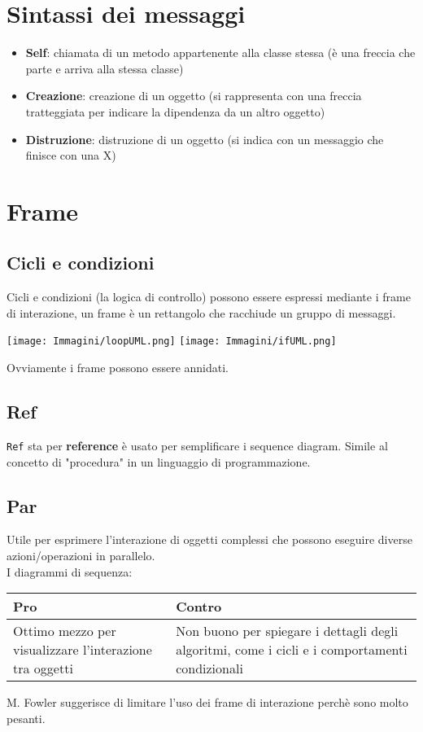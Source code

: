 \documentclass[12pt, a4paper]{report}
\begin{document}
\section{Sintassi dei messaggi}
\begin{itemize}
    \item \textbf{Self}: chiamata di un metodo appartenente alla classe stessa (è una freccia che parte e arriva alla stessa classe)
    \item \textbf{Creazione}: creazione di un oggetto (si rappresenta con una freccia tratteggiata per indicare la dipendenza da un altro oggetto)
    \item \textbf{Distruzione}: distruzione di un oggetto (si indica con un messaggio che finisce con una X)
\end{itemize}
\section{Frame}
\subsection{Cicli e condizioni}
Cicli e condizioni (la logica di controllo) possono essere espressi mediante i frame di interazione, un frame è un rettangolo che racchiude un gruppo di messaggi.
\begin{center}
    \texttt{[image: Immagini/loopUML.png]}
    \texttt{[image: Immagini/ifUML.png]}
\end{center}
Ovviamente i frame possono essere annidati.
\subsection{Ref}
\texttt{Ref} sta per \textbf{reference} è usato per semplificare i sequence diagram. Simile al concetto di "procedura" in un linguaggio di programmazione.
\subsection{Par}
Utile per esprimere l'interazione di oggetti complessi che possono eseguire diverse azioni/operazioni in parallelo.\\
I diagrammi di sequenza:
\begin{center}
    \begin{tabular}{| p{8cm} | p{8cm} |}
        \hline
        \textbf{Pro} & \textbf{Contro} \\
        \hline
        Ottimo mezzo per visualizzare l'interazione tra oggetti & Non buono per spiegare i dettagli degli algoritmi, come i cicli e i comportamenti condizionali \\
        \hline
    \end{tabular}
\end{center}
M. Fowler suggerisce di limitare l'uso dei frame di interazione perchè sono molto pesanti.
\end{document}
